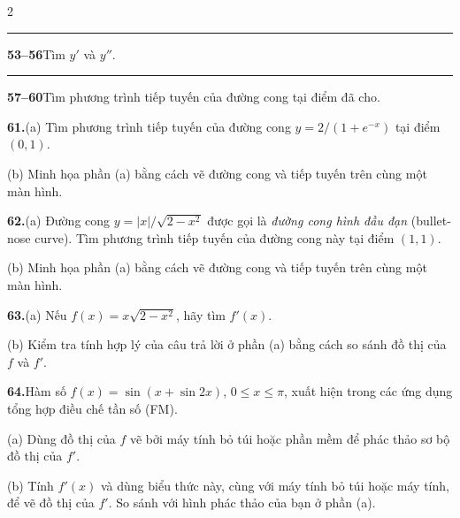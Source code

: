 \begin{multicols*}{2}
\vspace{3pt}
{\color{stewartblue}\rule{\linewidth}{0.6pt}}\vspace{3pt}
{\color{stewartblue}\bfseries 53--56}\enspace Tìm $y'$ và $y''$.\par\vspace{4pt}


\vspace{3pt}
{\color{stewartblue}\rule{\linewidth}{0.6pt}}\vspace{3pt}
{\color{stewartblue}\bfseries 57--60}\enspace Tìm phương trình tiếp tuyến của đường cong tại điểm đã cho.\par\vspace{4pt}


\vspace{5pt}
\noindent\textbf{61.}\enspace (a) Tìm phương trình tiếp tuyến của đường cong $y = 2/(1 + e^{-x})$ tại điểm $(0, 1)$.\par
\noindent\llap{\graphicon}(b) Minh họa phần (a) bằng cách vẽ đường cong và tiếp tuyến trên cùng một màn hình.\par\vspace{4pt}

\noindent\textbf{62.}\enspace (a) Đường cong $y = |x|/\sqrt{2 - x^2}$ được gọi là \textit{đường cong hình đầu đạn} (bullet-nose curve). Tìm phương trình tiếp tuyến của đường cong này tại điểm $(1, 1)$.\par
\noindent\llap{\graphicon}(b) Minh họa phần (a) bằng cách vẽ đường cong và tiếp tuyến trên cùng một màn hình.\par\vspace{4pt}

\noindent\textbf{63.}\enspace (a) Nếu $f(x) = x\sqrt{2 - x^2}$, hãy tìm $f'(x)$.\par
\noindent\llap{\graphicon}(b) Kiểm tra tính hợp lý của câu trả lời ở phần (a) bằng cách so sánh đồ thị của $f$ và $f'$.\par\vspace{4pt}

\noindent\llap{\graphicon}\textbf{64.}\enspace Hàm số $f(x) = \sin(x + \sin 2x)$, $0 \le x \le \pi$, xuất hiện trong các ứng dụng tổng hợp điều chế tần số (FM).\par
(a) Dùng đồ thị của $f$ vẽ bởi máy tính bỏ túi hoặc phần mềm để phác thảo sơ bộ đồ thị của $f'$.\par
(b) Tính $f'(x)$ và dùng biểu thức này, cùng với máy tính bỏ túi hoặc máy tính, để vẽ đồ thị của $f'$. So sánh với hình phác thảo của bạn ở phần (a).\par\vspace{4pt}


\end{multicols*}
